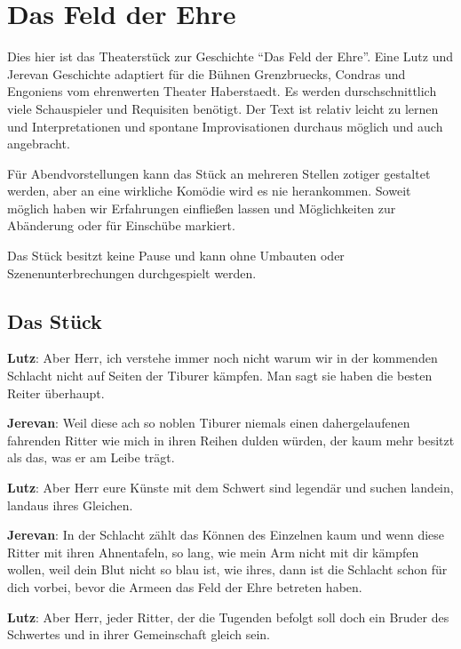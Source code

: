 \documentclass[a5paper,6pt]{book}
\begin{document}
\chapter{Das Feld der Ehre}


Dies hier ist das Theaterstück zur Geschichte “Das Feld der Ehre”. Eine Lutz und Jerevan Geschichte adaptiert für die Bühnen Grenzbruecks, Condras und Engoniens vom 
ehrenwerten Theater Haberstaedt.
Es werden durschschnittlich viele Schauspieler und Requisiten benötigt. Der Text ist relativ leicht zu lernen und Interpretationen und spontane Improvisationen 
durchaus
möglich und auch angebracht.

Für Abendvorstellungen kann das Stück an mehreren Stellen zotiger gestaltet werden, aber an eine wirkliche Komödie wird es nie herankommen. Soweit möglich haben wir
Erfahrungen einfließen lassen und Möglichkeiten zur Abänderung oder für Einschübe markiert.

Das Stück besitzt keine Pause und kann ohne Umbauten oder Szenenunterbrechungen durchgespielt werden.



\newpage



\section{Das Stück}

\twocolumn
\setlength{\columnseprule}{0,1mm}

\textbf{Lutz}: Aber Herr, ich verstehe immer noch nicht warum wir in der kommenden Schlacht nicht auf Seiten der Tiburer kämpfen. Man sagt sie haben die besten Reiter überhaupt.

\textbf{Jerevan}: Weil diese ach so noblen Tiburer niemals einen dahergelaufenen fahrenden Ritter wie mich in ihren Reihen dulden würden, der kaum mehr besitzt als das, was er am Leibe trägt.

\textbf{Lutz}: Aber Herr eure Künste mit dem Schwert sind legendär und suchen landein, landaus ihres Gleichen.

\textbf{Jerevan}: In der Schlacht zählt das Können des Einzelnen kaum und wenn diese Ritter mit ihren Ahnentafeln, so lang, wie mein Arm nicht mit dir kämpfen wollen, weil dein Blut nicht so blau ist, wie ihres, dann ist die Schlacht schon für dich vorbei, bevor die Armeen das Feld der Ehre betreten haben.

\textbf{Lutz}: Aber Herr, jeder Ritter, der die Tugenden befolgt soll doch ein Bruder des Schwertes und in ihrer Gemeinschaft gleich sein.
\end{document}
